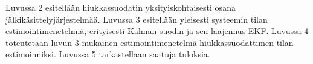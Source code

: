  

Luvussa 2 esitellään hiukkassuodatin yksityiskohtaisesti osana jälkikäsittelyjärjestelmää.
Luvussa 3 esitellään yleisesti systeemin tilan estimointimenetelmiä, erityisesti Kalman-suodin ja sen laajennus EKF.
Luvussa 4 toteutetaan luvun 3 mukainen estimointimenetelmä hiukkassuodattimen tilan estimoinniksi. Luvussa 5 tarkastellaan saatuja tuloksia.